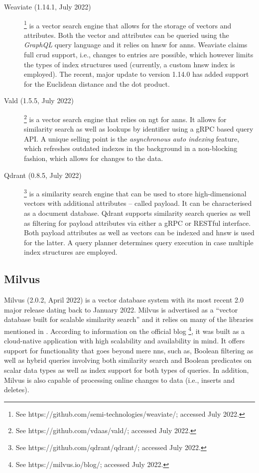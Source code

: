 \begin{description}
    \item[Weaviate (1.14.1, July 2022)]\footnote{See https://github.com/semi-technologies/weaviate/; accessed July 2022.} is a vector search engine that allows for the storage of vectors and attributes. Both the vector and attributes can be queried using the \emph{GraphQL} query language and it relies on \acrshort{hnsw} \cite{Malkov:2018Efficient} for \acrshort{anns}. Weaviate claims full \acrshort{crud} support, i.e., changes to entries are possible, which however limits the types of index structures used (currently, a custom \acrshort{hnsw} index is employed). The recent, major update to version 1.14.0 has added support for the Euclidean distance and the dot product.
    \item[Vald (1.5.5, July 2022)]\footnote{See https://github.com/vdaas/vald/; accessed July 2022.} is a vector search engine that relies on \acrshort{ngt} for \acrshort{anns}. It allows for similarity search as well as lookups by identifier using a gRPC based query API. A unique selling point is the \emph{asynchronous auto indexing} feature, which refreshes outdated indexes in the background in a non-blocking fashion, which allows for changes to the data.
    \item[Qdrant (0.8.5, July 2022)]\footnote{See https://github.com/qdrant/qdrant/; accessed July 2022.} is a similarity search engine that can be used to store high-dimensional vectors with additional attributes -- called payload. It can be characterised as a document database. Qdrant supports similarity search queries as well as filtering for payload attributes via either a gRPC or RESTful interface. Both payload attributes as well as vectors can be indexed and \acrshort{hnsw} \cite{Malkov:2018Efficient} is used for the latter. A query planner determines query execution in case multiple index structures are employed.
\end{description}

\subsection{Milvus}
\label{section:milvus}

Milvus (2.0.2, April 2022) \cite{Wang:2021Milvus} is a vector database system with its most recent 2.0 major release dating back to January 2022. Milvus is advertised as a ``vector database built for scalable similarity search'' and it relies on many of the libraries mentioned in . According to information on the official blog \footnote{See https://milvus.io/blog/; accessed July 2022.}, it was built as a cloud-native application with high scalability and availability in mind. It offers support for functionality that goes beyond mere \acrshort{nns}, such as, Boolean filtering as well as hybrid queries involving both similarity search and Boolean predicates on scalar data types as well as index support for both types of queries. In addition, Milvus is also capable of processing online changes to data (i.e., inserts and deletes).

